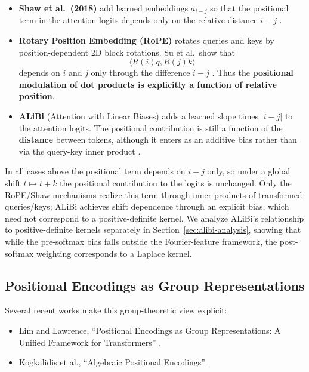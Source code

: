 \documentclass[11pt]{article}
\theoremstyle{definition}
\begin{document}
\begin{itemize}
    \item \textbf{Shaw et al.\ (2018)} add learned embeddings \(a_{i-j}\) so that the positional term in the attention logits depends only on the relative distance \(i-j\) \cite{shaw2018self}. 
    \item \textbf{Rotary Position Embedding (RoPE)} rotates queries and keys by position-dependent 2D block rotations. Su et al.\ show that
    \[
    \langle R(i) q, R(j) k \rangle
    \]
    depends on \(i\) and \(j\) only through the difference \(i-j\) \cite{su2021roformer}. Thus the \textbf{positional modulation of dot products is explicitly a function of relative position}.
    \item \textbf{ALiBi} (Attention with Linear Biases) adds a learned slope times \(|i-j|\) to the attention logits. The positional contribution is still a function of the \textbf{distance} between tokens, although it enters as an additive bias rather than via the query-key inner product \cite{press2022train}.
\end{itemize}

In all cases above the positional term depends on \(i-j\) only, so under a global shift \(t \mapsto t+k\) the positional contribution to the logits is unchanged. Only the RoPE/Shaw mechanisms realize this term through inner products of transformed queries/keys; ALiBi achieves shift dependence through an explicit bias, which need not correspond to a positive-definite kernel. We analyze ALiBi's relationship to positive-definite kernels separately in Section~\ref{sec:alibi-analysis}, showing that while the pre-softmax bias falls outside the Fourier-feature framework, the post-softmax weighting corresponds to a Laplace kernel.

\subsection{Positional Encodings as Group Representations}

Several recent works make this group-theoretic view explicit:

\begin{itemize}
    \item Lim and Lawrence, ``Positional Encodings as Group Representations: A Unified Framework for Transformers'' \cite{lim2024positional}.
    \item Kogkalidis et al., ``Algebraic Positional Encodings'' \cite{kogkalidis2023algebraic}.
\end{itemize}
\end{document}
